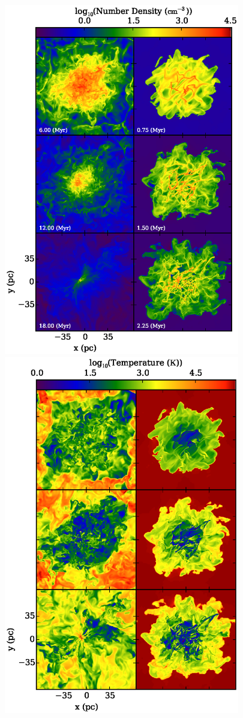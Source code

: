 \documentclass[useAMS,usenatbib]{mn2e}
\begin{document}
\begin{figure}
\begin{center}
\hspace{-1.2cm}
\includegraphics[width=10.3cm]{Images/slice_number_density_panel} \hspace{-2cm}
\includegraphics[width=10.3cm]{Images/temperature_panel}

\end{center}
\end{figure}
\end{document}
